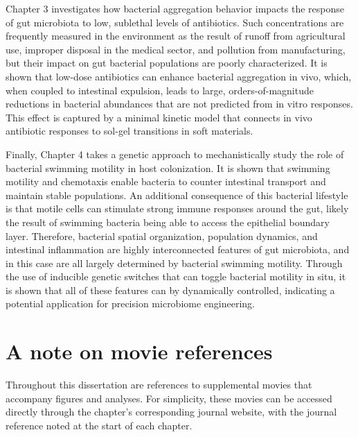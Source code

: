 Chapter 3 investigates how bacterial aggregation behavior impacts the response of gut microbiota to low, sublethal levels of antibiotics. Such concentrations are frequently measured in the environment as the result of runoff from agricultural use, improper disposal in the medical sector, and pollution from manufacturing, but their impact on gut bacterial populations are poorly characterized. It is shown that low-dose antibiotics can enhance bacterial aggregation in vivo, which, when coupled to intestinal expulsion, leads to large, orders-of-magnitude reductions in bacterial abundances that are not predicted from in vitro responses. This effect is captured by a minimal kinetic model that connects in vivo antibiotic responses to sol-gel transitions in soft materials.

Finally, Chapter 4 takes a genetic approach to mechanistically study the role of bacterial swimming motility in host colonization. It is shown that swimming motility and chemotaxis enable bacteria to counter intestinal transport and maintain stable populations. An additional consequence of this bacterial lifestyle is that motile cells can stimulate strong immune responses around the gut, likely the result of swimming bacteria being able to access the epithelial boundary layer. Therefore, bacterial spatial organization, population dynamics, and intestinal inflammation are highly interconnected features of gut microbiota, and in this case are all largely determined by bacterial swimming motility. Through the use of inducible genetic switches that can toggle bacterial motility in situ, it is shown that all of these features can by dynamically controlled, indicating a potential application for precision microbiome engineering.

\section{A note on movie references}
Throughout this dissertation are references to supplemental movies that accompany figures and analyses. For simplicity, these movies can be accessed directly through the chapter's corresponding journal website, with the journal reference noted at the start of each chapter. 
